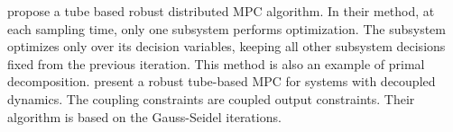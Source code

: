 \citet{trodden:richards:2006,trodden:richards:2007} propose a tube based robust distributed
MPC algorithm. In their method, at each sampling time, only one
subsystem performs optimization. The subsystem optimizes only over its
decision variables, keeping all other subsystem decisions fixed from
the previous iteration. This method is also an example of primal
decomposition. \citet{richards:how:2004} present a robust tube-based
MPC for systems with decoupled dynamics. The coupling constraints are
coupled output constraints. Their algorithm is based on the
Gauss-Seidel iterations.

